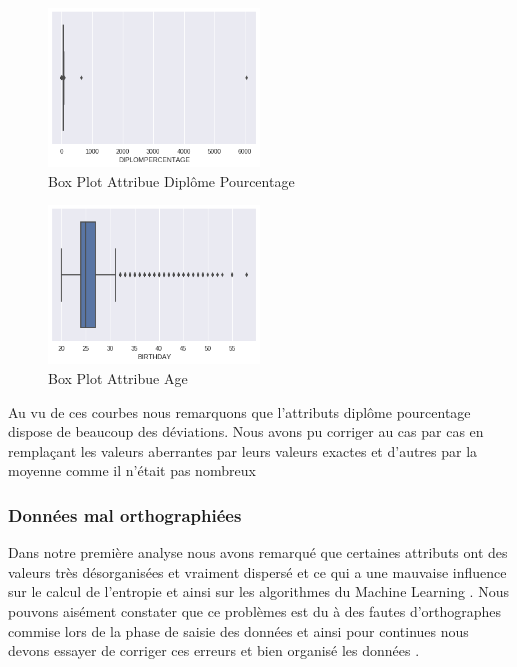 \begin{figure}[ht]
	\centering
	\includegraphics[width=0.5\textwidth]{fig/AGEPlot1.png}
	\caption{Box Plot Attribue Diplôme Pourcentage  }
	\label{fig:AgeBXPlot1}
\end{figure} 

\begin{figure}[ht]
	\centering
	\includegraphics[width=0.5\textwidth]{fig/PercetagePlot.png}
	\caption{Box Plot Attribue  Age  }
	\label{fig:PercBXPlot1}
\end{figure} 
Au vu de ces courbes nous remarquons que l'attributs diplôme pourcentage
dispose de beaucoup des déviations. Nous avons pu corriger au cas par cas en remplaçant les valeurs aberrantes par leurs valeurs exactes et d'autres par la moyenne comme il n'était pas nombreux
\subsubsection{Données mal orthographiées }
Dans notre première analyse nous avons remarqué que certaines  attributs ont des valeurs très désorganisées et vraiment dispersé et ce
qui a une mauvaise influence sur le calcul de l'entropie et ainsi sur
les algorithmes du Machine Learning . Nous pouvons aisément constater
que ce problèmes est du à des fautes d'orthographes commise lors de la
phase de saisie des données et ainsi pour continues nous devons essayer
de corriger ces erreurs et bien organisé les données . 

